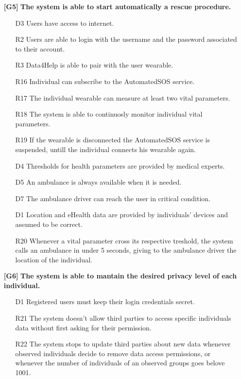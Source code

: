 \begin{enumerate}
\item[\textbf{[G5]}] \textbf{The system is able to start automatically a rescue procedure.}
\begin{enumerate}
\item[D3] Users have access to internet.
\item[R2] Users are able to login with the username and the password associated to their account.
\item[R3] Data4Help is able to pair with the user wearable.
\item[R16] Individual can subscribe to the AutomatedSOS service.
\item[R17] The individual wearable can measure at least two vital parameters.
\item[R18] The system is able to continuosly monitor individual vital parameters.
\item[R19] If the wearable is disconnected the AutomatedSOS service is suspended, untill the individual connects his wearable again.
\item[D4] Thresholds for health parameters are provided by medical experts.
\item[D5] An ambulance is always available when it is needed.
\item[D7] The ambulance driver can reach the user in critical condition.
\item[D1] Location and eHealth data are provided by individuals' devices and assumed to be correct.
\item[R20] Whenever a vital parameter cross its respective treshold, the system calls an ambulance in under 5 seconds, giving to the ambulance driver the location of the individual.
\end{enumerate}

\item[\textbf{[G6]}] \textbf{The system is able to mantain the desired privacy level of each individual.
}

\begin{enumerate}
\item[D1] Registered users must keep their login credentials secret.
\item[R21] The system doesn't allow third parties to access specific individuals data without first asking for their permission.
\item[R22] The system stops to update third parties about new data whenever observed individuals decide to remove data access permissions, or whenever the number of individuals of an observed groups goes belove 1001.
\end{enumerate}
\end{enumerate}


